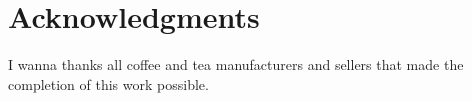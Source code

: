 \chapter*{Acknowledgments}
I wanna thanks all coffee and tea manufacturers and sellers that made the completion of this work possible. 
\clearpage